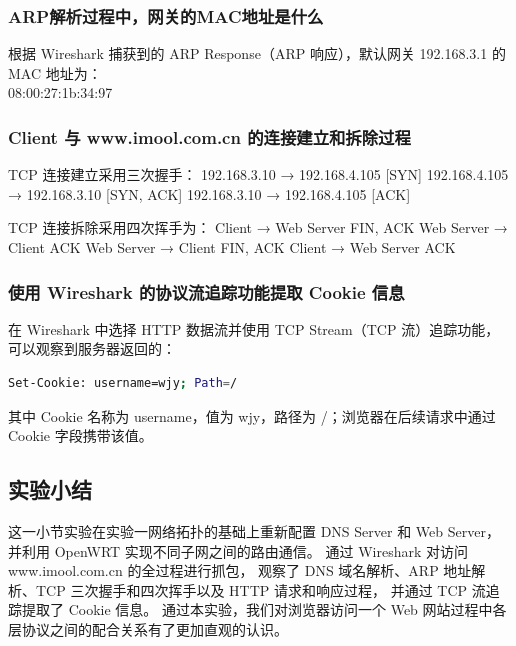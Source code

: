 \subsubsection{ARP解析过程中，网关的MAC地址是什么}
根据 Wireshark 捕获到的 ARP Response（ARP 响应），默认网关 192.168.3.1 的 MAC 地址为：\\
08:00:27:1b:34:97

\subsubsection{Client 与 www.imool.com.cn 的连接建立和拆除过程}
TCP 连接建立采用三次握手：
192.168.3.10 → 192.168.4.105    [SYN]
192.168.4.105 → 192.168.3.10    [SYN, ACK]
192.168.3.10 → 192.168.4.105    [ACK]

TCP 连接拆除采用四次挥手为：
Client → Web Server       FIN, ACK
Web Server → Client       ACK
Web Server → Client       FIN, ACK
Client → Web Server       ACK

\subsubsection{使用 Wireshark 的协议流追踪功能提取 Cookie 信息}
在 Wireshark 中选择 HTTP 数据流并使用 TCP Stream（TCP 流）追踪功能，
可以观察到服务器返回的：
\begin{lstlisting}[language=bash,caption={Cookie 的显示}]
Set-Cookie: username=wjy; Path=/
\end{lstlisting}
其中 Cookie 名称为 username，值为 wjy，路径为 /；浏览器在后续请求中通过 Cookie
字段携带该值。

\subsection{实验小结}
这一小节实验在实验一网络拓扑的基础上重新配置 DNS Server 和 Web Server，
并利用 OpenWRT 实现不同子网之间的路由通信。
通过 Wireshark 对访问 www.imool.com.cn 的全过程进行抓包，
观察了 DNS 域名解析、ARP 地址解析、TCP 三次握手和四次挥手以及 HTTP 请求和响应过程，
并通过 TCP 流追踪提取了 Cookie 信息。
通过本实验，我们对浏览器访问一个 Web 网站过程中各层协议之间的配合关系有了更加直观的认识。
